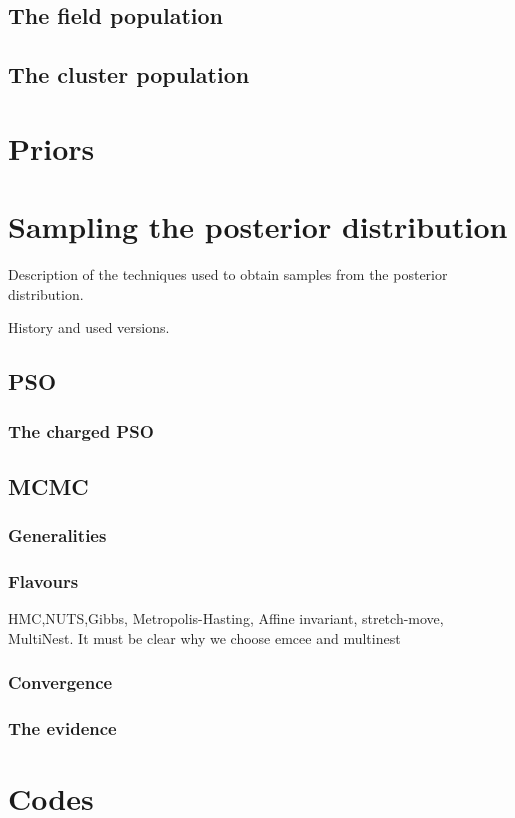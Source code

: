 \subsection{The field population}
\subsection{The cluster population}
\section{Priors}

\section{Sampling the posterior distribution}

Description of the techniques used to obtain samples from the posterior distribution.

History and used versions.

\subsection{PSO}
\subsubsection{The charged PSO}


\subsection{MCMC}
\subsubsection{Generalities}
\subsubsection{Flavours}
HMC,NUTS,Gibbs, Metropolis-Hasting, Affine invariant, stretch-move, MultiNest.
It must be clear why we choose emcee and multinest
\subsubsection{Convergence}
\subsubsection{The evidence}


\section{Codes}
